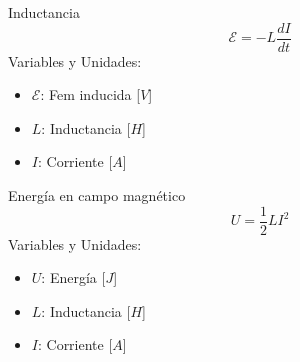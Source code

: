 \documentclass{article}
\begin{document}
\begin{multicols}{3}
\begin{teorema}{Inductancia}
    $$\mathcal{E} = -L \frac{dI}{dt}$$
    Variables y Unidades:
    \begin{itemize}
        \item $\mathcal{E}$: Fem inducida [$V$]
        \item $L$: Inductancia [$H$]
        \item $I$: Corriente [$A$]
    \end{itemize}
\end{teorema}

\begin{teorema}{Energía en campo magnético}
    $$U = \frac{1}{2} L I^2$$
    Variables y Unidades:
    \begin{itemize}
        \item $U$: Energía [$J$]
        \item $L$: Inductancia [$H$]
        \item $I$: Corriente [$A$]
    \end{itemize}
\end{teorema}

\end{multicols}
\end{document}
